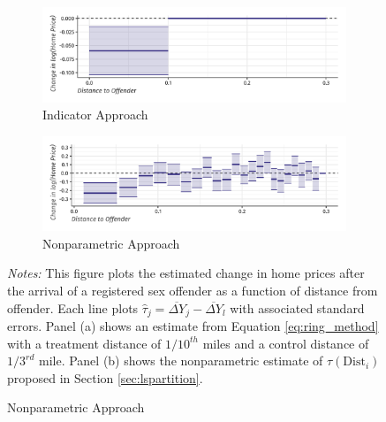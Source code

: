 \documentclass[12pt]{article}
\newcommand{\dist}{\text{Dist}}
\begin{document}
\begin{figure}[tb!]
    \caption{Effects of Offender Arrival on Home Prices \citep{Linden_Rockoff_2008}}\label{fig:lr}

    \begin{subfigure}{\textwidth}
        \caption{Indicator Approach}
        \centering
        \vspace{-2.5mm}
        \includegraphics[width=\textwidth]{../../figures/linden_rockoff_did.pdf}
    \end{subfigure}
    \hfill
    \begin{subfigure}{\textwidth}
        \caption{Nonparametric Approach}
        \centering
        \vspace{-2.5mm}
        \includegraphics[width=\textwidth]{../../figures/linden_rockoff.pdf}
    \end{subfigure}

    {\footnotesize{\it Notes:} This figure plots the estimated change in home prices after the arrival of a registered sex offender as a function of distance from offender. Each line plots $\hat{\tau}_j = \overline{\Delta Y}_j - \overline{\Delta Y}_l $ with associated standard errors. Panel (a) shows an estimate from Equation \ref{eq:ring_method} with a treatment distance of $1/10^{th}$ miles and a control distance of $1/3^{rd}$ mile. Panel (b) shows the nonparametric estimate of $\tau(\dist_i)$ proposed in Section \ref{sec:lspartition}.}
\end{figure}
\end{document}
